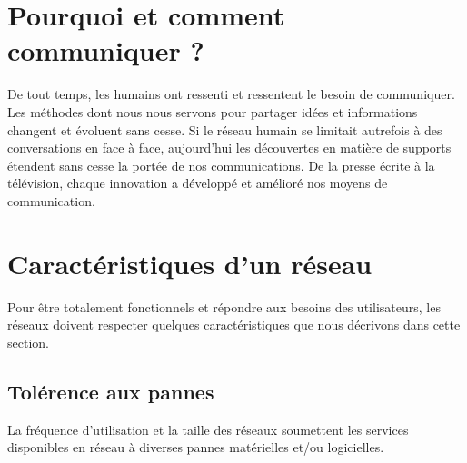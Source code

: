 \documentclass[11pt]{article}
\begin{document}
\UPSTIbuildPage

\section{Pourquoi et comment communiquer ?}
De tout temps, les humains ont ressenti et ressentent le besoin de communiquer.
Les méthodes dont nous nous servons pour partager idées et informations changent et évoluent sans cesse. Si le réseau humain se limitait autrefois à des conversations en face à face, aujourd'hui les découvertes en matière de supports étendent sans cesse la portée de nos communications. De la presse écrite à la télévision, chaque innovation a développé et amélioré nos moyens de communication.

\section{Caractéristiques d'un réseau}
\label{sec:caracteristiques}
Pour être totalement fonctionnels et répondre aux besoins des utilisateurs, les réseaux doivent respecter quelques caractéristiques que nous décrivons dans cette section.


\subsection{Tolérence aux pannes}
La fréquence d'utilisation et la taille des réseaux soumettent les services disponibles en réseau à diverses pannes matérielles et/ou logicielles.
\end{document}

